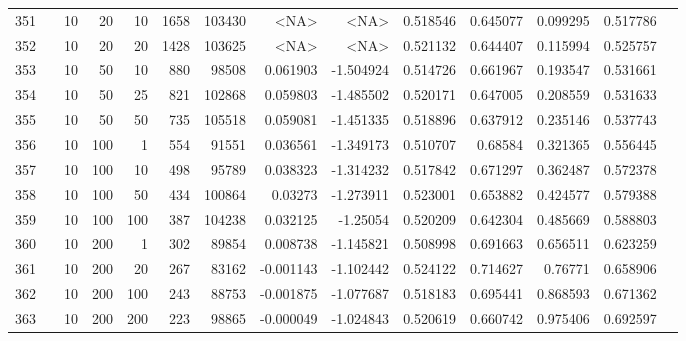 \begin{longtable}{llrrrrrrrrrrrr}
		351 & &           10 &                20 &           10 &           1658 &     103430 &      <NA> &      <NA> &  0.518546 &    0.645077 &       0.099295 &  0.517786 \\
		352 & &           10 &                20 &           20 &           1428 &     103625 &      <NA> &      <NA> &  0.521132 &    0.644407 &       0.115994 &  0.525757 \\
		353 & &           10 &                50 &           10 &         880 &      98508 &  0.061903 & -1.504924 &  0.514726 &    0.661967 &       0.193547 &  0.531661 \\
		354 & &           10 &                50 &           25 &         821 &     102868 &  0.059803 & -1.485502 &  0.520171 &    0.647005 &       0.208559 &  0.531633 \\
		355 & &           10 &                50 &           50 &         735 &     105518 &  0.059081 & -1.451335 &  0.518896 &    0.637912 &       0.235146 &  0.537743 \\
		356 & &           10 &               100 &            1 &         554 &      91551 &  0.036561 & -1.349173 &  0.510707 &     0.68584 &       0.321365 &  0.556445 \\
		357 & &           10 &               100 &           10 &         498 &      95789 &  0.038323 & -1.314232 &  0.517842 &    0.671297 &       0.362487 &  0.572378 \\
		358 & &           10 &               100 &           50 &         434 &     100864 &   0.03273 & -1.273911 &  0.523001 &    0.653882 &       0.424577 &  0.579388 \\
		359 & &           10 &               100 &          100 &         387 &     104238 &  0.032125 &  -1.25054 &  0.520209 &    0.642304 &       0.485669 &  0.588803 \\
		360 & &           10 &               200 &            1 &         302 &      89854 &  0.008738 & -1.145821 &  0.508998 &    0.691663 &       0.656511 &  0.623259 \\
		361 & &           10 &               200 &           20 &         267 &      83162 & -0.001143 & -1.102442 &  0.524122 &    0.714627 &        0.76771 &  0.658906 \\
		362 & &           10 &               200 &          100 &         243 &      88753 & -0.001875 & -1.077687 &  0.518183 &    0.695441 &       0.868593 &  0.671362 \\
		363 & &           10 &               200 &          200 &         223 &      98865 & -0.000049 & -1.024843 &  0.520619 &    0.660742 &       0.975406 &  0.692597 \\

\end{longtable}
